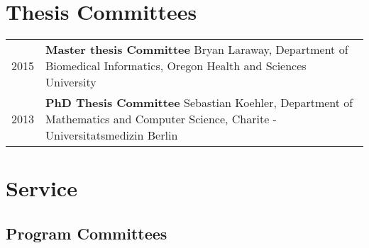 \documentclass[11pt,fullpage]{article}
\begin{document}
\section*{Thesis Committees}

\begin{longtable}{p{0.5in}|p{5.5in}}
 2015 & \textbf{Master thesis Committee} Bryan Laraway, Department of Biomedical Informatics, Oregon Health and Sciences University \\
 2013 & \textbf{PhD Thesis Committee} Sebastian Koehler, Department of Mathematics and Computer Science, Charite - Universitatsmedizin Berlin \\
\end{longtable}

\section*{Service}


\subsection*{Program Committees}
\end{document}
